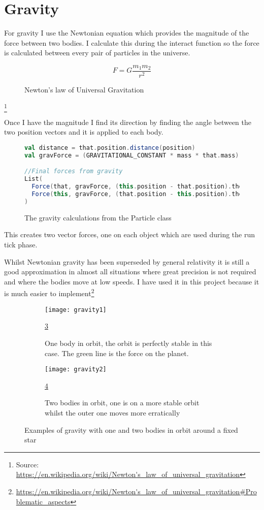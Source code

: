 	\section{Gravity}
	For gravity I use the Newtonian equation which provides the magnitude of the force between two bodies. I calculate this during the interact function so the force is calculated between every pair of particles in the universe.
	\begin{figure}[h]
		\begin{equation}
		F = G\frac{m_{1}m_{2}}{r^{2}}
		\end{equation}
		\caption{Newton's law of Universal Gravitation}
		\label{fig:gravEqn}
	\end{figure}\footnote{Source: \url{https://en.wikipedia.org/wiki/Newton's_law_of_universal_gravitation}}
	
	Once I have the magnitude I find its direction by finding the angle between the two position vectors and it is applied to each body.
	\begin{figure}[h]
		\centering
		\begin{lstlisting}[language=Scala]
val distance = that.position.distance(position)
val gravForce = (GRAVITATIONAL_CONSTANT * mass * that.mass) / Math.pow(distance, 2)

//Final forces from gravity
List(
  Force(that, gravForce, (this.position - that.position).theta),
  Force(this, gravForce, (that.position - this.position).theta)
)
		\end{lstlisting}
		\caption{The gravity calculations from the Particle class}
		\label{fig:gravCode}
	\end{figure}

	This creates two vector forces, one on each object which are used during the run tick phase.
	
	Whilst Newtonian gravity has been superseded by general relativity it is still a good approximation in almost all situations where great precision is not required and where the bodies move at low speeds. I have used it in this project because it is much easier to implement\footnote{\url{https://en.wikipedia.org/wiki/Newton's_law_of_universal_gravitation\#Problematic_aspects}}
	
	\begin{figure}[p]
		\centering
		\begin{subfigure}{0.9\textwidth}
			\centering
			\texttt{[image: gravity1]}
			\caption{One body in orbit, the orbit is perfectly stable in this case. The green line is the force on the planet.}
			\label{fig:gravExamplesSub1}
			\ref{fig:gravExamplesSub1}
		\end{subfigure}
		\begin{subfigure}{0.9\textwidth}
			\centering
			\texttt{[image: gravity2]}
			\caption{Two bodies in orbit, one is on a more stable orbit whilst the outer one moves more erratically} 
			\label{fig:gravExamplesSub2}
			\ref{fig:gravExamplesSub2}
		\end{subfigure}	
		\caption{Examples of gravity with one and two bodies in orbit around a fixed star}
		\label{fig:gravExamples}
	\end{figure}